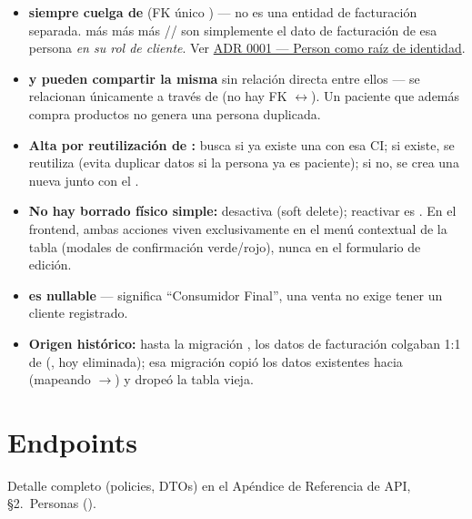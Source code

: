 \begin{itemize}
  \item \textbf{ siempre cuelga de } (FK único ) --- no es una entidad de facturación separada.  más  más  más // son simplemente el dato de facturación de esa persona \emph{en su rol de cliente}. Ver \hyperref[adr:0001]{ADR 0001 --- Person como raíz de identidad}.
  \item \textbf{ y  pueden compartir la misma } sin relación directa entre ellos --- se relacionan únicamente a través de  (no hay FK $\leftrightarrow$). Un paciente que además compra productos no genera una persona duplicada.
  \item \textbf{Alta por reutilización de :} \allowbreak {} busca si ya existe una  con esa CI; si existe, se reutiliza (evita duplicar datos si la persona ya es paciente); si no, se crea una nueva junto con el .
  \item \textbf{No hay borrado físico simple:}  desactiva (soft delete); reactivar es . En el frontend, ambas acciones viven exclusivamente en el menú contextual de la tabla (modales de confirmación verde/rojo), nunca en el formulario de edición.
  \item \textbf{ es nullable} ---  significa ``Consumidor Final'', una venta no exige tener un cliente registrado.
  \item \textbf{Origen histórico:} hasta la migración , los datos de facturación colgaban 1:1 de  (, hoy eliminada); esa migración copió los datos existentes hacia  (mapeando $\to$) y dropeó la tabla vieja.
\end{itemize}

\section{Endpoints}
\label{sec:clientes-endpoints}

Detalle completo (policies, DTOs) en el Apéndice de Referencia de API, \S 2.\ Personas (\allowbreak {}).

